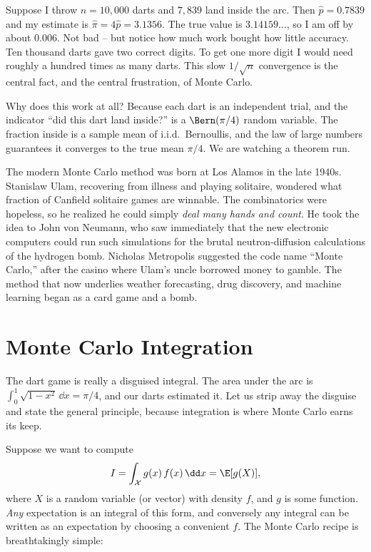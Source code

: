 \begin{example}[Estimating $\pi$]
\label{ch35:ex-pi}
Suppose I throw $n = 10{,}000$ darts and $7{,}839$ land inside the arc. Then
$\hat p = 0.7839$ and my estimate is $\hat\pi = 4\hat p = 3.1356$. The true value
is $3.14159\dots$, so I am off by about $0.006$. Not bad -- but notice how much
work bought how little accuracy. Ten thousand darts gave two correct digits. To
get one more digit I would need roughly a hundred times as many darts. This slow
$1/\sqrt n$ convergence is the central fact, and the central frustration, of
Monte Carlo.
\end{example}

Why does this work at all? Because each dart is an independent trial, and the
indicator ``did this dart land inside?'' is a $\Bern(\pi/4)$ random variable. The
fraction inside is a sample mean of i.i.d.\ Bernoullis, and the law of large
numbers guarantees it converges to the true mean $\pi/4$. We are watching a
theorem run.

\begin{historybox}
The modern Monte Carlo method was born at Los Alamos in the late 1940s. Stanislaw
Ulam, recovering from illness and playing solitaire, wondered what fraction of
Canfield solitaire games are winnable. The combinatorics were hopeless, so he
realized he could simply \emph{deal many hands and count}. He took the idea to
John von Neumann, who saw immediately that the new electronic computers could
run such simulations for the brutal neutron-diffusion calculations of the
hydrogen bomb. Nicholas Metropolis suggested the code name ``Monte Carlo,''
after the casino where Ulam's uncle borrowed money to gamble. The method that
now underlies weather forecasting, drug discovery, and machine learning began as
a card game and a bomb.
\end{historybox}

\section{Monte Carlo Integration}
\label{ch35:integration}

The dart game is really a disguised integral. The area under the arc is
$\int_0^1 \sqrt{1-x^2}\,\dd x = \pi/4$, and our darts estimated it. Let us strip
away the disguise and state the general principle, because integration is where
Monte Carlo earns its keep.

Suppose we want to compute
\[
  I = \int_{\mathcal X} g(x)\, f(x)\, \dd x = \E[g(X)],
\]
where $X$ is a random variable (or vector) with density $f$, and $g$ is some
function. \emph{Any} expectation is an integral of this form, and conversely any
integral can be written as an expectation by choosing a convenient $f$. The
Monte Carlo recipe is breathtakingly simple:

